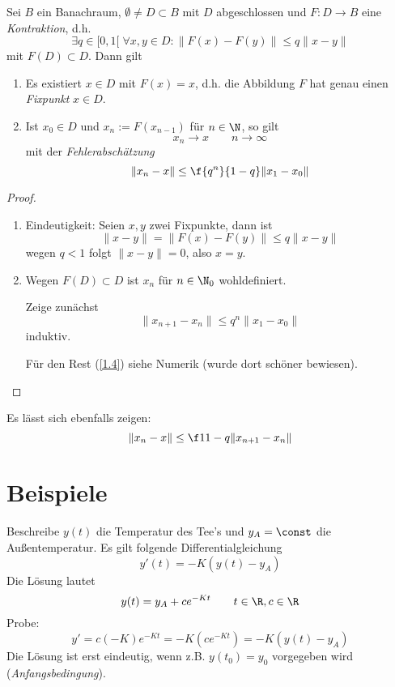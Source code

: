 \documentclass[a4paper,10pt]{scrbook}
\begin{document}
\begin{st} \label{1.3}
	Sei $B$ ein Banachraum, $\emptyset \neq D \subset B$ mit $D$ abgeschlossen und $F: D \to B$ eine \emph{Kontraktion}, d.h.
	\[
		\exists q \in [0,1[ \; \forall x,y \in D : \|F(x) - F(y)\| \le q\|x-y\|
	\]
	mit $F(D) \subset D$. Dann gilt
	\begin{enumerate}[1)]
		\item
			Es existiert $x\in D$ mit $F(x)=x$, d.h. die Abbildung $F$ hat genau einen \emph{Fixpunkt} $x\in D$.
		\item
			Ist $x_0 \in D$ und $x_n := F(x_{n-1})$ für $n\in \N$, so gilt
			\[
				x_n \to x \qquad n \to \infty
			\]
			mit der \emph{Fehlerabschätzung}
			\[
				\|x_n - x\| \le \f{q^n}{1-q} \|x_1 - x_0\|
			\]
	\end{enumerate}
	\begin{proof}
		\begin{enumerate}[1)]
			\item
				Eindeutigkeit: Seien $x,y$ zwei Fixpunkte, dann ist
				\[
					\|x-y\| = \|F(x) - F(y)\| \le q \|x-y\|
				\]
				wegen $q < 1$ folgt $\|x-y\| = 0$, also $x=y$.
			\item
				Wegen $F(D) \subset D$ ist $x_n$ für $n\in \N_0$ wohldefiniert.

				Zeige zunächst
				\[
					\|x_{n+1} - x_n\| \le q^n \|x_1 - x_0\|
				\]
				induktiv.

				Für den Rest (\ref{1.4}) siehe Numerik (wurde dort schöner bewiesen).
		\end{enumerate}
	\end{proof}
\end{st}

\begin{nt} \label{1.4}
	Es lässt sich ebenfalls zeigen:
	\[
		\|x_n - x\| \le \f 1{1-q} \|x_{n+1} -x_n \|
	\]
\end{nt}


\setcounter{section}{0}
\section{Beispiele} %

\begin{ex}[Tee] \label{2.1}
	Beschreibe $y(t)$ die Temperatur des Tee's und $y_A = \const$ die Außentemperatur.
	Es gilt folgende Differentialgleichung
	\[
		y'(t) = -K( y(t) - y_A)
	\]
	Die Lösung lautet
	\[
		y(t) = y_A + c e^{-Kt} \qquad t\in \R, c\in \R
	\]
	Probe:
	\[
		y' = c(-K)e^{-Kt} = -K(ce^{-Kt}) = -K(y(t) - y_A)
	\]
	Die Lösung ist erst eindeutig, wenn z.B. $y(t_0) = y_0$ vorgegeben wird (\emph{Anfangsbedingung}).
\end{ex}
\end{document}

